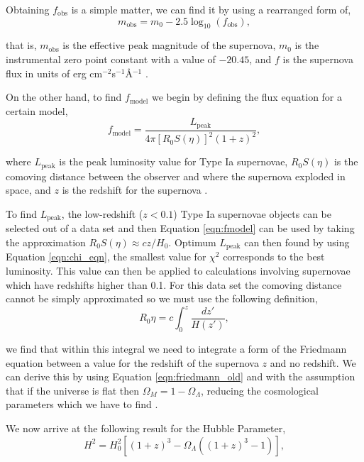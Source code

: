 \documentclass[twocolumn]{revtex4}
\begin{document}
Obtaining $f_\text{obs}$ is a simple matter, we can find it by using a rearranged form of,
\begin{equation}
m_\text{obs}=m_0 - 2.5\log_{10}(f_\text{obs}),
\label{eqn:mag_flux}
\end{equation}

that is, $m_\text{obs}$ is the effective peak magnitude of the supernova, $m_0$ is the instrumental zero point constant with a value of $-20.45$, and $f$ is the supernova flux in units of erg cm$^{-2}$s$^{-1}$\AA$^{-1}$ \cite{script}.

On the other hand, to find $f_\text{model}$ we begin by defining the flux equation for a certain model,
\begin{equation}
f_\text{model}=\frac{L_\text{peak}}{4\pi [R_0 S(\eta)]^2 (1+z)^2},
\label{eqn:fmodel}
\end{equation}

where $L_\text{peak}$ is the peak luminosity value for Type Ia supernovae, $R_0 S(\eta)$ is the comoving distance between the observer and where the supernova exploded in space, and $z$ is the redshift for the supernova \cite{script}.

To find $L_\text{peak}$, the low-redshift ($z<0.1$) Type Ia supernovae objects can be selected out of a data set and then Equation \ref{eqn:fmodel} can be used by taking the approximation $R_0 S(\eta) \approx cz/H_0$. Optimum $L_\text{peak}$ can then found by using Equation \ref{eqn:chi_eqn}, the smallest value for $\chi^2$ corresponds to the best luminosity. This value can then be applied to calculations involving supernovae which have redshifts higher than 0.1. For this data set the comoving distance cannot be simply approximated so we must use the following definition,
\begin{equation}
R_0 \eta = c \int_0^z \frac{dz'}{H(z')},
\label{eqn:comoving_integral}
\end{equation}

we find that within this integral we need to integrate a form of the Friedmann equation between a value for the redshift of the supernova $z$ and no redshift. We can derive this by using Equation \ref{eqn:friedmann_old} and with the assumption that if the universe is flat then $\Omega_{M} = 1 - \Omega_{\Lambda}$, reducing the cosmological parameters which we have to find \cite{script}. 

We now arrive at the following result for the Hubble Parameter,
\begin{equation}
H^2 = H_0^2 [(1+z)^3 - \Omega_{\Lambda} ((1+z)^3-1)],
\label{eqn:hubble_parameter}
\end{equation}
\end{document}
